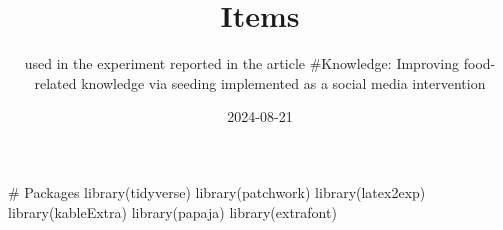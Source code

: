 \documentclass[
  letterpaper,
  DIV=11,
  numbers=noendperiod]{scrartcl}
\title{Items}
\subtitle{used in the experiment reported in the article \#Knowledge:
Improving food-related knowledge via seeding implemented as a social
media intervention}
\author{}
\date{2024-08-21}
\newenvironment{Shaded}{\begin{snugshade}}{\end{snugshade}}
\newcommand{\CommentTok}[1]{\textcolor[rgb]{0.37,0.37,0.37}{#1}}
\newcommand{\FunctionTok}[1]{\textcolor[rgb]{0.28,0.35,0.67}{#1}}
\newcommand{\NormalTok}[1]{\textcolor[rgb]{0.00,0.23,0.31}{#1}}
\begin{document}
\maketitle


\begin{Shaded}
\begin{Highlighting}[]
\CommentTok{\# Packages}
\FunctionTok{library}\NormalTok{(tidyverse) }
\FunctionTok{library}\NormalTok{(patchwork)}
\FunctionTok{library}\NormalTok{(latex2exp)}
\FunctionTok{library}\NormalTok{(kableExtra)}
\FunctionTok{library}\NormalTok{(papaja)}
\FunctionTok{library}\NormalTok{(extrafont)}
\end{Highlighting}
\end{Shaded}
\end{document}
